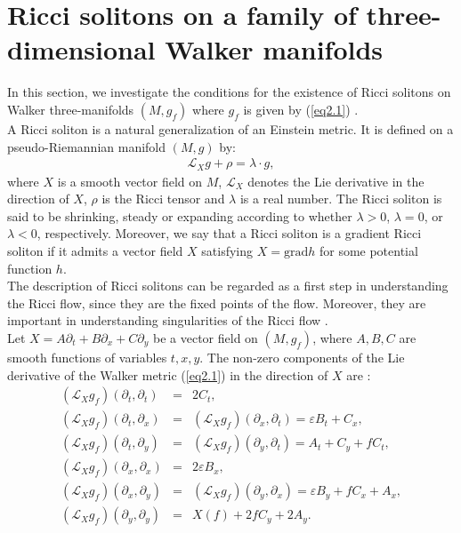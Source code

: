\documentclass[reqno, 12pt]{amsart}
\numberwithin{equation}{section}
\begin{document}
\section{Ricci solitons on a family of three-dimensional Walker manifolds}\label{Soliton}

\noindent
In this section, we investigate the conditions for the existence of Ricci solitons 
on Walker three-manifolds $(M, g_f)$ where $g_f$ is given by (\ref{eq2.1}) . \\

A Ricci soliton is a natural generalization of an Einstein metric. It is defined 
on a pseudo-Riemannian manifold $(M, g)$ by:
\begin{eqnarray}\label{eq3.1} 
\mathcal{L}_X g + \rho = \lambda \cdot g,
\end{eqnarray}
where $X$ is a smooth vector field on $M$,  $\mathcal{L}_X$ denotes the
Lie derivative in the direction of $X$, $\rho$ is the Ricci tensor and $\lambda$
is a real number. The Ricci soliton is said to be shrinking, steady or expanding
according to whether $\lambda > 0$, $\lambda =0$, or $\lambda < 0$,
respectively. Moreover, we say that a Ricci soliton is a gradient Ricci soliton
if it admits a vector field $X$ satisfying $X = \mathrm{grad} h$ for some
potential function $h$.\\



\noindent
The description of Ricci solitons can be regarded as a ﬁrst step in understanding 
the Ricci flow, since they are the ﬁxed points of the ﬂow. Moreover, they
are important in understanding singularities of the Ricci ﬂow \cite{Brozos2012}.\\
 
Let  $X = A\partial_t+ B\partial_x + C \partial_y $ be a vector field on $(M, g_f)$, 
where $A, B, C$ are smooth functions of variables $t, x, y$. The  non-zero 
components of the Lie derivative of the Walker metric (\ref{eq2.1}) in the direction 
of $X$ are :
\begin{eqnarray}\label{eq3.2}
(\mathcal{L}_X g_f)(\partial_t,\partial_t) &=& 2C_t , \nonumber \\
(\mathcal{L}_X g_f)(\partial_t,\partial_x) &=& (\mathcal{L}_X g_f)(\partial_x,\partial_t) 
= \varepsilon B_t +C_x, \nonumber \\
(\mathcal{L}_X g_f)(\partial_t,\partial_y) &=& (\mathcal{L}_X g_f)(\partial_y,\partial_t) 
= A_t +C_y +fC_t ,  \nonumber \\
(\mathcal{L}_X g_f)(\partial_x,\partial_x) &=& 2\varepsilon B_x, \nonumber \\
(\mathcal{L}_X g_f)(\partial_x,\partial_y) &=& (\mathcal{L}_X g_f)(\partial_y,\partial_x)
= \varepsilon B_y +fC_x +A_x, \nonumber \\
(\mathcal{L}_X g_f)(\partial_y,\partial_y) &=& X(f)+2fC_y+2A_y. 
\end{eqnarray}
\end{document}
